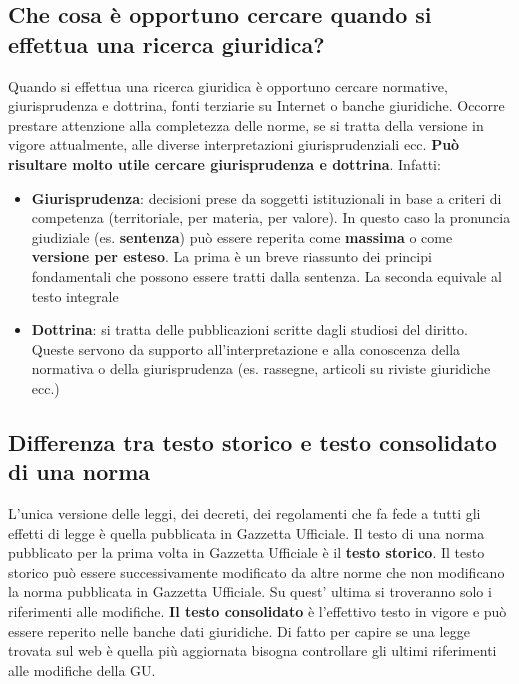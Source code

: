 \subsection{Che cosa è opportuno cercare quando si effettua una ricerca giuridica?}
Quando si effettua una ricerca giuridica è opportuno cercare normative, giurisprudenza e dottrina, fonti terziarie
 su Internet o banche giuridiche. \newline
Occorre prestare attenzione alla completezza delle norme, se si tratta della versione in vigore attualmente,
alle diverse interpretazioni giurisprudenziali ecc. \newline
\newline
\textbf{Può risultare molto utile cercare giurisprudenza e dottrina}. Infatti:
\begin{itemize}
    \item \textbf{Giurisprudenza}: decisioni prese da soggetti istituzionali in base a criteri di competenza (territoriale, per materia, per valore). \newline
            In questo caso la pronuncia giudiziale (es. \textbf{sentenza}) può essere reperita come \textbf{massima} o come \textbf{versione per esteso}.
            La prima è un breve riassunto dei principi fondamentali che possono essere tratti dalla sentenza. La seconda equivale al testo integrale
    \item \textbf{Dottrina}: si tratta delle pubblicazioni scritte dagli studiosi del diritto. Queste servono da supporto all'interpretazione e alla conoscenza
            della normativa o della giurisprudenza (es. rassegne, articoli su riviste giuridiche ecc.)
\end{itemize}

\subsection{Differenza tra testo storico e testo consolidato di una norma}
L'unica versione delle leggi, dei decreti, dei regolamenti che fa fede a tutti gli effetti di legge è quella pubblicata in Gazzetta Ufficiale.\newline
Il testo di una norma pubblicato per la prima volta in Gazzetta Ufficiale è il \textbf{testo storico}.\newline
Il testo storico può essere successivamente modificato da altre norme che non modificano la norma pubblicata in
Gazzetta Ufficiale. Su quest' ultima si troveranno solo i riferimenti alle modifiche.\newline
\textbf{Il testo consolidato} è l'effettivo testo in vigore e può essere reperito nelle banche dati giuridiche.\newline
Di fatto per capire se una legge trovata sul web è quella più aggiornata bisogna controllare gli ultimi riferimenti alle modifiche della GU.

